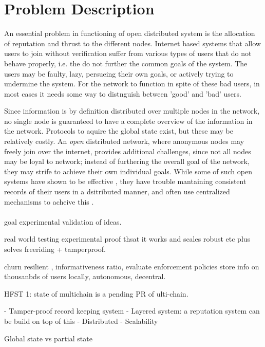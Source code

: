 \chapter{Problem Description}
An essential problem in functioning of open distributed system is the allocation of reputation and thrust to the different nodes. Internet based systems that allow users to join without verification suffer from various types of users that do not behave properly, i.e. the do not further the common goals of the system. The users may be faulty, lazy, persueing their own goals, or actively trying to undermine the system. For the network to function in spite of these bad users, in most cases it needs some way to distnguish between 'good' and 'bad' users. 

 Since information is by definition distributed over multiple nodes in the network, no single node is guaranteed to have a complete overview of the information in the network. Protocols to aquire the global state exist, but these may be relatively costly\cite{}. An \emph{open} distributed network, where anonymous nodes may freely join over the internet, provides additional challenges, since not all nodes may be loyal to network; instead of furthering the overall goal of the network, they may strife to achieve their own individual goals. While some of such open systems have shown to be effective \cite{}, they have trouble mantaining consistent records of their users \cite{} in a dsitributed manner, and often use centralized mechanisms to acheive this \cite{}.\\
\\

goal experimental validation of ideas.

real world testing experimental proof thsat it works and scales robust etc plus solves freeriding + tamperproof.

churn resilient , informativeness ratio, evaluate enforcement policies
store info on thousanbds of users locally, autonomous, decentral.

HFST 1: state of multichain is a pending PR of ulti-chain.

	- Tamper-proof record keeping system
	- Layered system: a reputation system can be build on top of this
	- Distributed	
	- Scalability


{Global state vs partial state}
